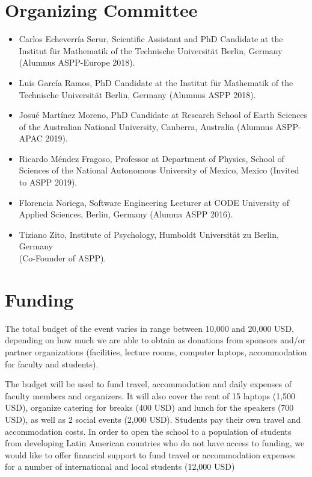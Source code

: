 \documentclass{article}[11pt]
\begin{document}
\section*{Organizing Committee}
\begin{itemize}
\item Carlos Echeverr\'ia Serur, Scientific Assistant and PhD Candidate at the
Institut f\"ur Mathematik of the Technische Universit\"at Berlin, Germany
(Alumnus ASPP-Europe 2018).

\item Luis Garc\'ia Ramos, PhD Candidate at the Institut f\"ur Mathematik
of the Technische Universit\"at Berlin, Germany (Alumnus ASPP 2018).

\item Josu\'e Mart\'inez Moreno, PhD Candidate at Research School of Earth
Sciences of the Australian National University, Canberra, Australia (Alumnus
ASPP-APAC 2019).

\item Ricardo M\'endez Fragoso, Professor at Department of Physics, School
of Sciences of the National Autonomous University of Mexico, Mexico (Invited to
ASPP 2019).

\item Florencia Noriega, Software Engineering Lecturer at CODE University
of Applied Sciences, Berlin, Germany (Alumna ASPP 2016).

\item Tiziano Zito, Institute of Psychology, Humboldt Universit\"at zu Berlin,
Germany\\ (Co-Founder of ASPP).
\end{itemize}

\section*{Funding}
The total budget of the event varies in range between 10,000 and 20,000 USD,
depending on how much we are able to obtain as donations from sponsors and/or
partner organizations (facilities, lecture rooms, computer laptops,
accommodation for faculty and students).

The budget will be used to fund travel, accommodation and daily expenses of
faculty members and organizers. It will also cover the rent of 15 laptops
(1,500 USD), organize catering for breaks (400 USD) and lunch for the speakers
(700 USD), as well as 2 social events (2,000 USD). Students  pay their own
travel and accommodation costs. In order to open the school to a population of
students from developing Latin American countries who do not have access to
funding, we would like to offer financial support to fund travel or
accommodation expenses for a number of international and local students (12,000
USD)
\end{document}
